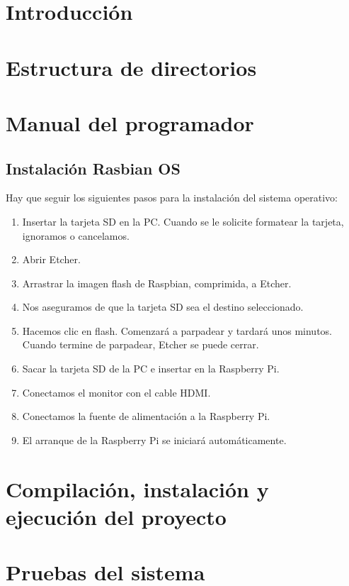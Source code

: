 
\section{Introducción}

\section{Estructura de directorios}

\section{Manual del programador}

\subsection{Instalación Rasbian OS}
Hay que seguir los siguientes pasos para la instalación del sistema operativo:
\begin{enumerate}
\item Insertar la tarjeta SD en la PC. Cuando se le solicite formatear la tarjeta, ignoramos o cancelamos.
\item Abrir Etcher.
\item Arrastrar la imagen flash de Raspbian, comprimida, a Etcher.
\item Nos aseguramos de que la tarjeta SD sea el destino seleccionado.
\item Hacemos clic en flash. Comenzará a parpadear y tardará unos minutos. Cuando termine de parpadear, Etcher se puede cerrar.
\item Sacar la tarjeta SD de la PC e insertar en la Raspberry Pi.

\item Conectamos el monitor con el cable HDMI.
\item Conectamos la fuente de alimentación a la Raspberry Pi.
\item El arranque de la Raspberry Pi se iniciará automáticamente.
    
\end{enumerate}

\section{Compilación, instalación y ejecución del proyecto}

\section{Pruebas del sistema}

